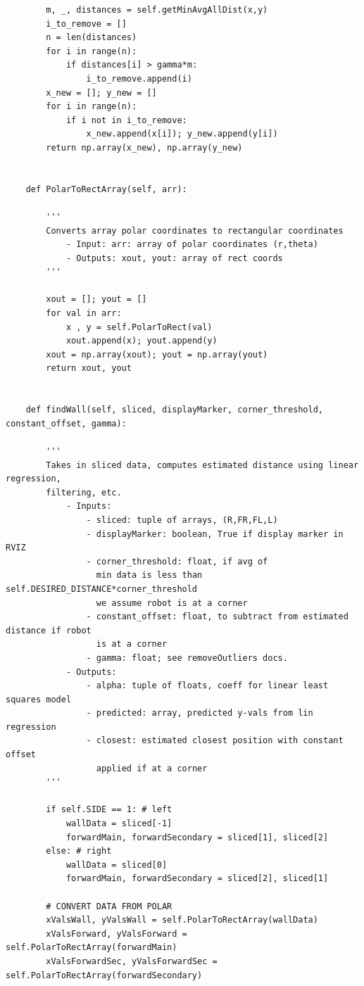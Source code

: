 \documentclass{article}
\begin{document}
{\begin{verbatim}
        m, _, distances = self.getMinAvgAllDist(x,y)
        i_to_remove = []
        n = len(distances)
        for i in range(n):
            if distances[i] > gamma*m:
                i_to_remove.append(i)
        x_new = []; y_new = []
        for i in range(n):
            if i not in i_to_remove:
                x_new.append(x[i]); y_new.append(y[i])
        return np.array(x_new), np.array(y_new)


    def PolarToRectArray(self, arr):
        
        '''
        Converts array polar coordinates to rectangular coordinates 
            - Input: arr: array of polar coordinates (r,theta)
            - Outputs: xout, yout: array of rect coords
        '''

        xout = []; yout = []
        for val in arr:
            x , y = self.PolarToRect(val)
            xout.append(x); yout.append(y)
        xout = np.array(xout); yout = np.array(yout)
        return xout, yout


    def findWall(self, sliced, displayMarker, corner_threshold, constant_offset, gamma):

        '''
        Takes in sliced data, computes estimated distance using linear regression,
        filtering, etc. 
            - Inputs:
                - sliced: tuple of arrays, (R,FR,FL,L)
                - displayMarker: boolean, True if display marker in RVIZ
                - corner_threshold: float, if avg of 
                  min data is less than self.DESIRED_DISTANCE*corner_threshold
                  we assume robot is at a corner
                - constant_offset: float, to subtract from estimated distance if robot
                  is at a corner
                - gamma: float; see removeOutliers docs. 
            - Outputs:
                - alpha: tuple of floats, coeff for linear least squares model
                - predicted: array, predicted y-vals from lin regression
                - closest: estimated closest position with constant offset
                  applied if at a corner
        '''

        if self.SIDE == 1: # left
            wallData = sliced[-1]
            forwardMain, forwardSecondary = sliced[1], sliced[2]
        else: # right
            wallData = sliced[0]
            forwardMain, forwardSecondary = sliced[2], sliced[1]
        
        # CONVERT DATA FROM POLAR
        xValsWall, yValsWall = self.PolarToRectArray(wallData)
        xValsForward, yValsForward = self.PolarToRectArray(forwardMain)
        xValsForwardSec, yValsForwardSec = self.PolarToRectArray(forwardSecondary)


\end{verbatim}}
\end{document}
